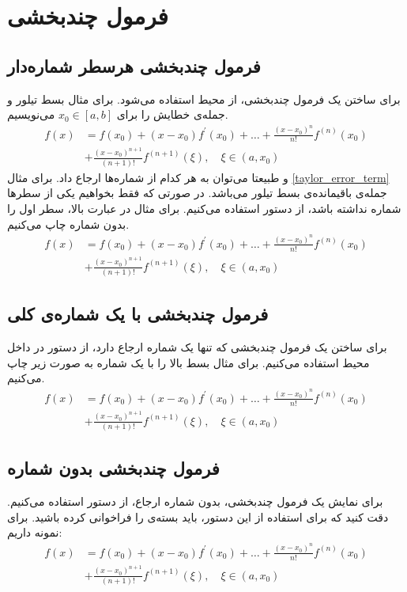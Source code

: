 \chapter{فرمول چندبخشی}
\section{فرمول چندبخشی هرسطر شماره‌دار}
برای ساختن یک فرمول چندبخشی، از محیط  استفاده می‌شود. برای مثال بسط تیلور و جمله‌ی خطایش را برای $x_0\in[a,b]$ می‌نویسیم.
\begin{align}
f(x) &= f(x_0) + (x-x_0)f^\prime(x_0) + \dots + \frac{(x-x_0)^n}{n!}f^{(n)}(x_0) \label{first_line_taylor} \\
	 &+ \frac{(x-x_0)^{n+1}}{(n+1)!}f^{(n+1)}(\xi),\quad \xi\in(a,x_0) \label{taylor_error_term}
\end{align}
و طبیعتا می‌توان به هر کدام از شماره‌ها ارجاع داد. برای مثال \eqref{taylor_error_term} جمله‌ی باقیمانده‌ی بسط تیلور می‌باشد. در صورتی که فقط بخواهیم یکی از سطرها شماره نداشته باشد، از دستور  استفاده می‌کنیم. برای مثال در عبارت بالا، سطر اول را بدون شماره چاپ می‌کنیم.
\begin{align}
f(x) &= f(x_0) + (x-x_0)f^\prime(x_0) + \dots + \frac{(x-x_0)^n}{n!}f^{(n)}(x_0) \nonumber \\
	 &+ \frac{(x-x_0)^{n+1}}{(n+1)!}f^{(n+1)}(\xi),\quad \xi\in(a,x_0) \label{taylor_error_term_2}
\end{align}

\section{فرمول چندبخشی با یک شماره‌ی کلی}
برای ساختن یک فرمول چندبخشی که تنها یک شماره ارجاع دارد، از دستور  در داخل محیط  استفاده می‌کنیم. برای مثال بسط بالا را با یک شماره به صورت زیر چاپ می‌کنیم.
\begin{equation}
\begin{split}
f(x) &= f(x_0) + (x-x_0)f^\prime(x_0) + \dots + \frac{(x-x_0)^n}{n!}f^{(n)}(x_0) \\
	 &+ \frac{(x-x_0)^{n+1}}{(n+1)!}f^{(n+1)}(\xi),\quad \xi\in(a,x_0)
\end{split}
\end{equation}

\section{فرمول چندبخشی بدون شماره}
برای نمایش یک فرمول چندبخشی، بدون شماره ارجاع، از دستور  استفاده می‌کنیم. دقت کنید که برای استفاده از این دستور، باید بسته‌ی  را فراخوانی کرده باشید. برای نمونه داریم:
\begin{align*}
f(x) &= f(x_0) + (x-x_0)f^\prime(x_0) + \dots + \frac{(x-x_0)^n}{n!}f^{(n)}(x_0) \\
	 &+ \frac{(x-x_0)^{n+1}}{(n+1)!}f^{(n+1)}(\xi),\quad \xi\in(a,x_0)
\end{align*}